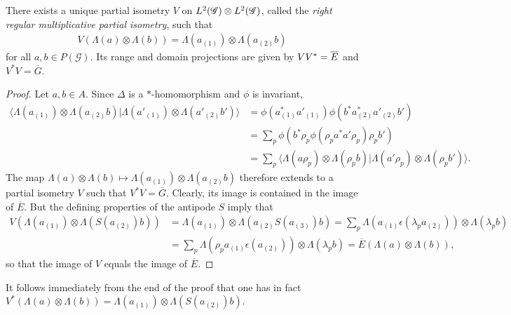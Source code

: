 \begin{Lem} \label{lemma:partial-isometry}
There exists a unique partial isometry $V$ on $L^{2}(\mathscr{G}) \otimes L^{2}(\mathscr{G})$, called the \emph{right regular multiplicative partial isometry},
such that
\begin{align*}
  V(\Lambda(a) \otimes \Lambda(b)) = \Lambda(a_{(1)}) \otimes \Lambda(a_{(2)}b)
\end{align*}
for all $a,b\in P(\mathscr{G})$. Its range and domain projections are given by $VV^{*} = \overline{E}$
and $V^{*}V = \overline{G}$.
\end{Lem}
\begin{proof}
  Let $a,b \in A$. Since $\Delta$ is a $*$-homomorphism and $\phi$ is
invariant,
  \begin{align*}
    \langle \Lambda(a_{(1)}) \otimes
    \Lambda(a_{(2)}b)|\Lambda(a'_{(1)}) \otimes
    \Lambda(a'_{(2)}b')\rangle &=
    \phi(a_{(1)}^{*}a'_{(1)})\phi(b^{*}a_{(2)}^{*}a'_{(2)}b') \\
    &= \sum_{p}
    \phi(b^{*}\rho_{p}\phi(\rho_{p}a^{*}a'\rho_{p})\rho_{p}b') \\
    & =\sum_{p} \langle\Lambda(a\rho_{p}) \otimes \Lambda(\rho_{p}b) |
    \Lambda(a'\rho_{p}) \otimes \Lambda(\rho_{p}b')\rangle.
  \end{align*}
 The map $\Lambda(a) \otimes \Lambda(b)  \mapsto \Lambda(a_{(1)})
 \otimes \Lambda(a_{(2)}b)$ therefore extends to a partial isometry
 $V$ such that $V^{*}V=\overline{G}$. Clearly, its image is
 contained in the image of $\overline{E}$. But the defining properties of the
 antipode $S$ imply that
 \begin{align*}
 V(\Lambda(a_{(1)}) \otimes \Lambda(S(a_{(2)})b))   &=
 \Lambda(a_{(1)}) \otimes \Lambda(a_{(2)}S(a_{(3)})b) =  \sum_{p}\Lambda(a_{(1)}\epsilon(\lambda_p a_{(2)})) \otimes \Lambda(\lambda_{p}b)   \\
 &= \sum_{p}\Lambda(\rho_{p}a_{(1)}\epsilon(a_{(2)})) \otimes \Lambda(\lambda_{p}b) 
 =\overline{E}(\Lambda(a) \otimes \Lambda(b)),
 \end{align*}
so that the image of $V$ equals the image of $\overline{E}$.
\end{proof}

\begin{Rem}\label{RemFormAdj} It follows immediately from the end of the proof that one has in fact  $V^*(\Lambda(a)\otimes \Lambda(b)) = \Lambda(a_{(1)}) \otimes \Lambda(S(a_{(2)})b)$.
\end{Rem} 

